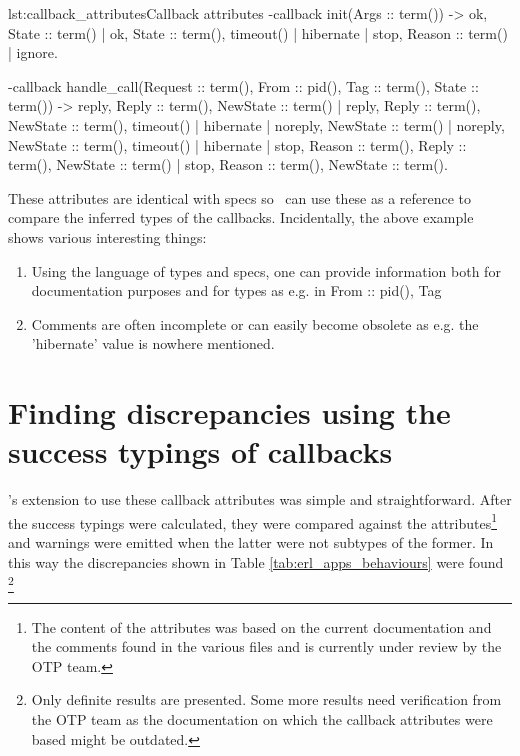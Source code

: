 \begin{console}{lst:callback_attributes}{Callback attributes}
-callback init(Args :: term()) ->
    {ok, State :: term()} |
    {ok, State :: term(), timeout() | hibernate} |
    {stop, Reason :: term()} | 
    ignore.

-callback handle_call(Request :: term(), From :: {pid(), Tag :: term()},
                      State :: term()) ->
    {reply, Reply :: term(), NewState :: term()} |
    {reply, Reply :: term(), NewState :: term(), timeout() | hibernate} |
    {noreply, NewState :: term()} |
    {noreply, NewState :: term(), timeout() | hibernate} |
    {stop, Reason :: term(), Reply :: term(), NewState :: term()} |
    {stop, Reason :: term(), NewState :: term()}.


\end{console}

These attributes are identical with specs so \dr\ can use these as a
reference to compare the inferred types of the callbacks.
Incidentally, the above example shows various interesting things:

\begin{enumerate}
\item Using the language of types and specs, one can provide
  information both for documentation purposes and for types as e.g. in
  From :: {pid(), Tag}
\item Comments are often incomplete or can easily become obsolete as
  e.g. the 'hibernate' value is nowhere mentioned.
\end{enumerate}

\section{Finding discrepancies using the success typings of callbacks}
\label{sct:behaviour_discrepancies}

\dr's extension to use these callback attributes was simple and
straightforward. After the success typings were calculated, they were
compared against the attributes\footnote{The content of the attributes
  was based on the current documentation and the comments found in the
  various files and is currently under review by the OTP team.} and
warnings were emitted when the latter were not subtypes of the
former. In this way the discrepancies shown in Table
\ref{tab:erl_apps_behaviours} were found \footnote{Only definite
  results are presented. Some more results need verification from the
  OTP team as the documentation on which the callback attributes were
  based might be outdated.}

